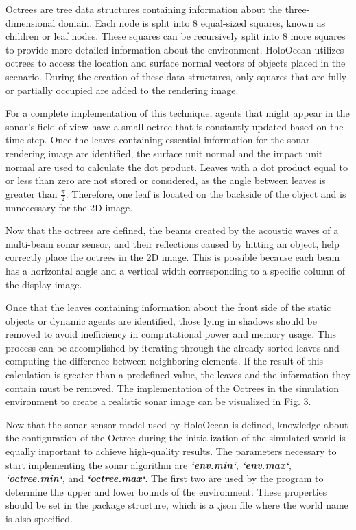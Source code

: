\documentclass[]{article}
\begin{document}
	Octrees are tree data structures containing information about the three-dimensional domain. Each node is split into 8 equal-sized squares, known as children or leaf nodes. These squares can be recursively split into 8 more squares to provide more detailed information about the environment. HoloOcean utilizes octrees to access the location and surface normal vectors of objects placed in the scenario. During the creation of these data structures, only squares that are fully or partially occupied are added to the rendering image.
	
	For a complete implementation of this technique, agents that might appear in the sonar's field of view have a small octree that is constantly updated based on the time step. Once the leaves containing essential information for the sonar rendering image are identified, the surface unit normal and the impact unit normal are used to calculate the dot product. Leaves with a dot product equal to or less than zero are not stored or considered, as the angle between leaves is greater than $\frac{π}{2}$. Therefore, one leaf is located on the backside of the object and is unnecessary for the 2D image.
	
	
	Now that the octrees are defined, the beams created by the acoustic waves of a multi-beam sonar sensor, and their reflections caused by hitting an object, help correctly place the octrees in the 2D image. This is possible because each beam has a horizontal angle and a vertical width corresponding to a specific column of the display image.
	
	Once that the leaves containing information about the front side of the static objects or dynamic agents are identified, those lying in shadows should be removed to avoid inefficiency in computational power and memory usage. This process can be accomplished by iterating through the already sorted leaves and computing the difference between neighboring elements. If the result of this calculation is greater than a predefined value, the leaves and the information they contain must be removed. The implementation of the Octrees in the simulation environment to create a realistic sonar image can be visualized in Fig. 3.
	
	\newpage
	
	Now that the sonar sensor model used by HoloOcean is defined, knowledge about the configuration of the Octree during the initialization of the simulated world is equally important to achieve high-quality results. The parameters necessary to start implementing the sonar algorithm are \textbf{\textit{`env.min`}}, \textbf{\textit{`env.max`}}, \textbf{\textit{`octree.min`}}, and \textbf{\textit{`octree.max`}}. The first two are used by the program to determine the upper and lower bounds of the environment. These properties should be set in the package structure, which is a .json file where the world name is also specified. 
	
\end{document}
